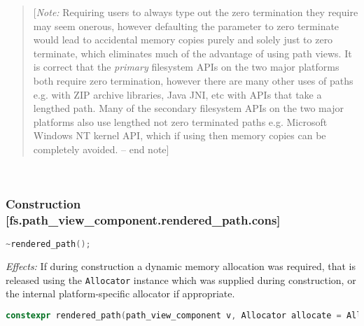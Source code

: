 \documentclass[11pt]{article}
\newcommand{\code}[2][cpp]{\lstinline[language=#1,basicstyle=\small\ttfamily]{#2}}
\newcommand{\desc}[1]{\textit{#1}}
\newcommand{\effects}{\desc{Effects: }}
\newcommand{\note}[1]{\begin{quote}[\textit{Note:} #1 -- end note]\end{quote}}
\begin{document}
\color{black}

\note{Requiring users to always type out the zero termination they require may seem onerous, however defaulting the parameter to zero terminate would lead to accidental memory copies purely and solely just to zero terminate, which eliminates much of the advantage of using path views. It is correct that the \emph{primary} filesystem APIs on the two major platforms both require zero termination, however there are many other uses of paths e.g. with ZIP archive libraries, Java JNI, etc with APIs that take a lengthed path. Many of the secondary filesystem APIs on the two major platforms also use lengthed not zero terminated paths e.g. Microsoft Windows NT kernel API, which if using then memory copies can be completely avoided.}

\color{darkgreen}

~ \\

\subsubsection*{Construction [fs.path\_view\_component.rendered\_path.cons]}

\begin{lstlisting}[language=cpp]
    ~rendered_path();
\end{lstlisting}

\effects If during construction a dynamic memory allocation was required, that is released using the \code{Allocator} instance which was supplied during construction, or the internal platform-specific allocator if appropriate.\\

\begin{lstlisting}[language=cpp]
    constexpr rendered_path(path_view_component v, Allocator allocate = Allocator());
\end{lstlisting}
\end{document}
